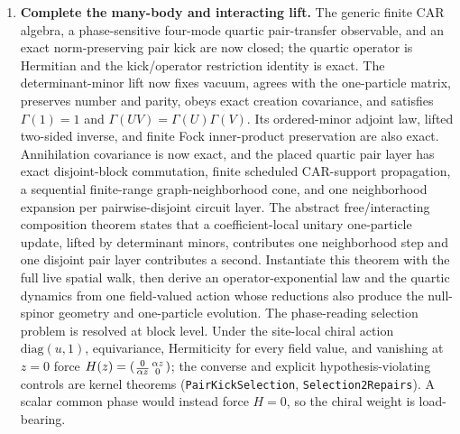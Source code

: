 \documentclass[11pt]{article}
\begin{document}
\begin{enumerate}[leftmargin=2em]
  eigenvectors through an involutive-compression engine, a
  machine-checked multiplicity census (dimension $2$ for singleton
  fields, $4$ for domain blocks, $0$ for controls), and a
  kernel-checked impossibility: no translation-invariant index of the
  periodic extension, composed with any decoder, reproduces the
  positional certificate.  What remains open here is the general-length
  reduction: a finite index operator for the \emph{derived winding} on
  arbitrary registers, with a localized protected mode and a displayed
  stability class, and a theorem connecting it to the companion's
  positional data.
  \item \textbf{Complete the many-body and interacting lift.}
  The generic finite CAR algebra, a phase-sensitive four-mode quartic
  pair-transfer observable, and an exact norm-preserving pair kick are now
  closed; the quartic operator is Hermitian and the kick/operator restriction
  identity is exact.  The determinant-minor lift now fixes vacuum, agrees with
  the one-particle matrix, preserves number and parity, obeys exact creation
  covariance, and satisfies $\Gamma(1)=1$ and
  $\Gamma(UV)=\Gamma(U)\Gamma(V)$.  Its ordered-minor adjoint law, lifted
  two-sided inverse, and finite Fock inner-product preservation are also exact.
  Annihilation covariance is now exact, and the placed quartic pair layer has
  exact disjoint-block commutation, finite scheduled CAR-support propagation,
  a sequential finite-range graph-neighborhood cone, and one neighborhood
  expansion per pairwise-disjoint circuit layer.  The abstract free/interacting
  composition theorem states that a coefficient-local unitary one-particle update,
  lifted by determinant minors, contributes one neighborhood step and one
  disjoint pair layer contributes a second.  Instantiate this theorem with the
  full live spatial walk, then derive an
  operator-exponential law and the quartic dynamics from one
  field-valued action whose reductions also produce the null-spinor geometry
  and one-particle evolution.
  The phase-reading selection problem is resolved at block level.  Under the
  site-local chiral action $\mathrm{diag}(u,1)$, equivariance, Hermiticity for
  every field value, and vanishing at $z=0$ force
  $H(z)=\begin{psmallmatrix}0&\alpha z\\
  \overline{\alpha z}&0\end{psmallmatrix}$; the converse and explicit
  hypothesis-violating controls are kernel theorems
  (\texttt{PairKickSelection}, \texttt{Selection2Repairs}).  A scalar common
  phase would instead force $H=0$, so the chiral weight is load-bearing.


\end{enumerate}
\end{document}

